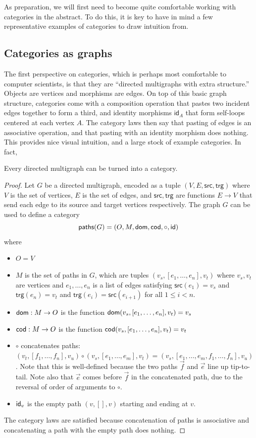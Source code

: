 As preparation, we will first need to become quite comfortable working
with categories in the abstract. To do this, it is key to
have in mind a few representative examples of categories
to draw intuition from.

\subsection{Categories as graphs}

The first perspective on categories, which is perhaps most
comfortable to computer scientists, is that they are ``directed multigraphs with extra structure.''
Objects are vertices and morphisms are edges.
On top of this basic graph structure, categories come with a
composition operation that pastes two incident edges together to form a third,
and identity morphisms \(\mathsf{id}_A\) that form self-loops centered at each vertex \(A\).
The category laws then say that pasting of edges is an associative operation,
and that pasting with an identity morphism does nothing.
This provides nice visual intuition, and a large stock of example categories.
In fact,
\begin{construction}
  Every directed multigraph can be turned into a category.
\end{construction}
\begin{proof}
  Let \(G\) be a directed multigraph,
  encoded as a tuple \((V,E,\mathsf{src},\mathsf{trg})\)
  where \(V\) is the set of vertices, \(E\) is the set of edges,
  and \(\mathsf{src},\mathsf{trg}\) are functions \(E\to V\)
  that send each edge to its source and target vertices respectively.
  The graph \(G\) can be used to define a category
  \[
  \mathsf{paths}(G) = (O,M,\operatorname{\mathsf{dom}},\operatorname{\mathsf{cod}},\circ,\mathsf{id})
  \]
  where
  \begin{itemize}
  \item \(O = V\)
  \item \(M\) is the set of paths in \(G\),
    which are tuples \((v_s,[e_1,\dots,e_n],v_t)\)
    where \(v_s,v_t\) are vertices and \(e_1,\dots,e_n\) is a list of edges satisfying
    \(\mathsf{src}(e_1) = v_s\) and \(\mathsf{trg}(e_n) = v_t\)
    and \(\mathsf{trg}(e_i) = \mathsf{src}(e_{i+1})\)
    for all \(1\le i < n\).
  \item \(\operatorname{\mathsf{dom}} : M \to O\) is the function \(\operatorname{\mathsf{dom}}(v_s,[e_1,\dots,e_n],v_t) = v_s\)
  \item \(\operatorname{\mathsf{cod}} : M \to O\) is the function \(\operatorname{\mathsf{cod}}(v_s,[e_1,\dots,e_n],v_t) = v_t\)
  \item \(\circ\) concatenates paths:
    \((v_t,[f_1,\dots,f_n],v_u)\circ(v_s,[e_1,\dots,e_m],v_t) = (v_s,[e_1,\dots,e_m,f_1,\dots,f_n],v_u)\).
    Note that this is well-defined because the two paths \(\vec f\) and \(\vec e\) line up tip-to-tail.
    Note also that \(\vec e\) comes before \(\vec f\) in the concatenated path, due to the reversal of order
    of arguments to \(\circ\).
  \item \(\mathsf{id}_v\) is the empty path \((v,[],v)\) starting and ending at \(v\).
  \end{itemize}
  The category laws are satisfied because concatenation of paths is associative and concatenating a path with the
  empty path does nothing.
\end{proof}
